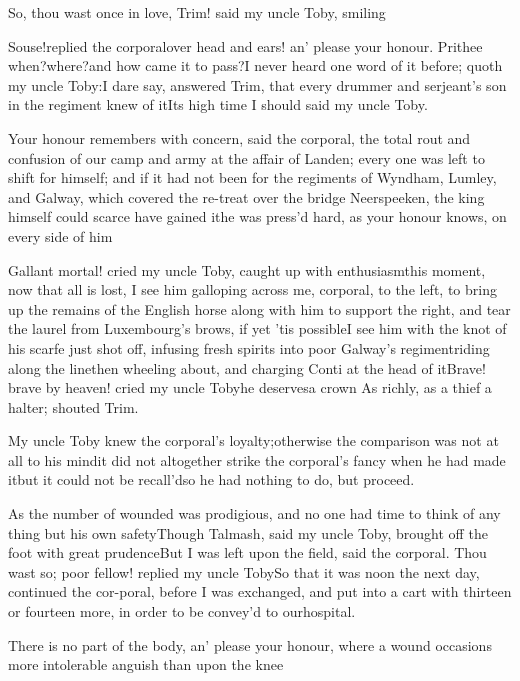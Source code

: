 \documentclass{article}
\begin{document}
\newpage
So, thou wast once in love, Trim! said my uncle Toby, smiling\tsh

Souse!\@ replied the corporal\tsk over head and ears! an’ please your honour. Prithee
when?\@ where?\tsk and how came it to pass?\tsk I never heard one word of it before; quoth
my uncle Toby:\tsh I dare say, answered Trim, that every drummer and
serjeant’s son in the regiment knew of it\tsh Its high time I should \tsh said my
uncle Toby.

Your honour remembers with concern, said the corporal, the total rout and confusion
of our camp and army at the affair of Landen; every one was left to shift for
himself; and if it had not been for the regiments of Wyndham, Lumley, and Galway,
which covered the re-\pb treat over the bridge Neerspeeken, the king himself could
scarce have gained it\tsh he was press’d hard, as your honour knows, on every side
of him\tsh

Gallant mortal! cried my uncle Toby, caught up with
enthusiasm\tsk this moment, now that all is lost, I see him
galloping across me, corporal, to the left, to bring up the remains
of the English horse along with him to support the right,
and tear the laurel from Luxembourg’s
brows, if yet ’tis possible\tsh I see him with the
knot of his scarfe just shot off, infusing fresh spirits into poor
Galway’s regiment\tsk riding along the
line\tsk then wheeling about, and charging Conti at the
head of it\tsh Brave! brave by heaven! cried my uncle
Toby\tsk he deserves\pb a crown \tsh As richly, as a
thief a halter; shouted Trim.

My uncle Toby knew the corporal’s
loyalty;\tsk otherwise the comparison was not at all to his
mind\tsh it did not altogether strike the corporal’s
fancy when he had made it\tsh but it could not be
recall’d\tsh so he had nothing to do, but
proceed.

As the number of wounded was prodigious, and no one had time to
think of any thing but his own safety\tsk Though Talmash,
said my uncle Toby, brought off the foot with great
prudence\tsh\break But I was left upon the field, said the
corporal. Thou wast so; poor fellow! replied my uncle
Toby\tsk So that it was noon the next day, continued the
cor-\pb poral, before I was exchanged, and put into a cart
with thirteen or fourteen more, in order to be convey’d to
our\break hospital.

There is no part of the body, an’ please your honour,
where a wound occasions more intolerable anguish than upon the
knee\tsh
\end{document}

